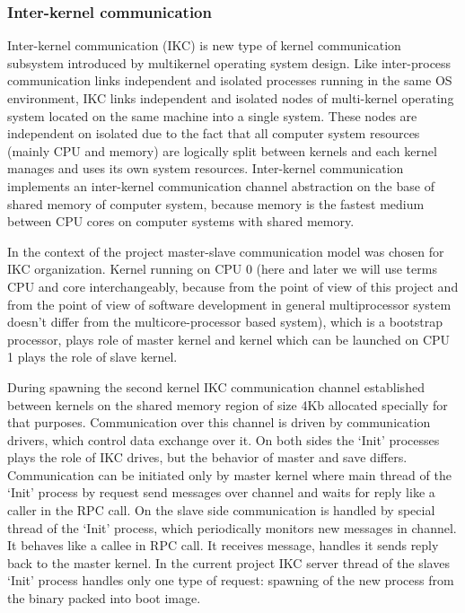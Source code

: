 \documentclass[a4paper,10pt]{article}
\begin{document}
\subsubsection{Inter-kernel communication}
	Inter-kernel communication (IKC) is new type of kernel communication subsystem introduced by multikernel operating system design.
	Like inter-process communication links independent and isolated processes running in the same OS environment, IKC links independent and isolated nodes of multi-kernel operating system located on the same machine into a single system.
	These nodes are independent on isolated due to the fact that all computer system resources (mainly CPU and memory) are logically split between kernels and each kernel manages and uses its own system resources. 
	Inter-kernel communication implements an inter-kernel communication channel abstraction on the base of shared memory of computer system, because memory is the fastest medium between CPU cores on computer systems with shared memory.
	
	In the context of the project master-slave communication model was chosen for IKC organization. 
	Kernel running on CPU 0 (here and later we will use terms CPU and core interchangeably, because from the point of view of this project and from the point of view of software development in general multiprocessor system doesn't differ from the multicore-processor based system), which is a bootstrap processor, plays role of master kernel and kernel which can be launched on CPU 1 plays the role of slave kernel.
	
	During spawning the second kernel IKC communication channel established between kernels on the shared memory region of size 4Kb allocated specially for that purposes.
	Communication over this channel is driven by communication drivers, which control data exchange over it.
	On both sides the `Init' processes plays the role of IKC drives, but the behavior of master and save differs.
	Communication can be initiated only by master kernel where main thread of the `Init' process by request send messages over channel and waits for reply like a caller in the RPC call.
	On the slave side communication is handled by special thread of the `Init' process, which periodically monitors new messages in channel.
	It behaves like a callee in RPC call. 
	It receives message, handles it sends reply back to the master kernel.
	In the current project IKC server thread of the slaves `Init' process handles only one type of request: spawning of the new process from the binary packed into boot image.
	
\end{document}
